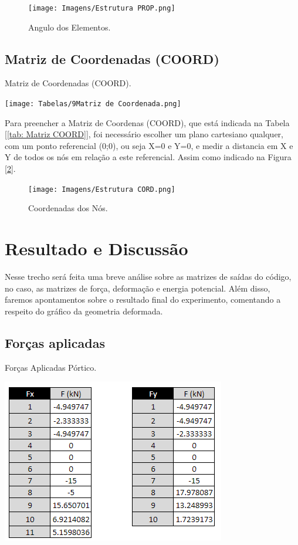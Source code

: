 \documentclass[deposito, acronym, symbols]{fei}
\begin{document}
\begin{figure}[!htb]
 \centering
    \caption{Angulo dos Elementos.}
    \texttt{[image: Imagens/Estrutura PROP.png]}
    \label{fig: Estrutura PROP}
 \end{figure}
 
\section{Matriz de Coordenadas (COORD)}

\begin{table}[!htb]
    \centering
    \caption{Matriz de Coordenadas (COORD).}
    \texttt{[image: Tabelas/9Matriz de Coordenada.png]}
    \label{tab: Matriz COORD}
 \end{table}

Para preencher a Matriz de Coordenas (COORD), que está indicada na Tabela [\ref{tab: Matriz COORD}], foi necessário escolher um plano cartesiano qualquer, com um ponto referencial (0;0), ou seja X=0 e Y=0, e medir a distancia em X e Y de todos os nós em relação a este referencial. Assim como indicado na Figura [\ref{fig: Estrutura COORD}].

\begin{figure}[ht]
   \centering
    \caption{Coordenadas dos Nós.}
    \texttt{[image: Imagens/Estrutura CORD.png]}
    \label{fig: Estrutura COORD}
 \end{figure}

\chapter{Resultado e Discussão}

Nesse trecho será feita uma breve análise sobre as matrizes de saídas do código, no caso, as matrizes de força, deformação e energia potencial. Além disso, faremos apontamentos sobre o resultado final do experimento, comentando a respeito do gráfico da geometria deformada.

\section{Forças aplicadas}


\begin{table}[!htb]
 \centering
    \caption{Forças Aplicadas Pórtico.}
    \includegraphics[width=0.6\linewidth]{Tabelas/3Forças Aplicadas (P).png}
    \label{tab: Forças aplicadas Portico}
\end{table}
\end{document}
